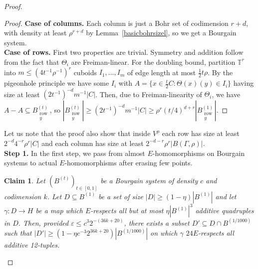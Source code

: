 \documentclass[a4paper,11pt]{article}
\numberwithin{theorem}{section}
\newtheorem{claim}[theorem]{Claim}
\theoremstyle{definition}
\newcommand{\on}[1]{
	\operatorname{#1}
}
\newcommand\ssk[1]{
	\substack{#1}
}
\begin{document}
\begin{proof}
\begin{proof}\textbf{Case of columns.} Each column is just a Bohr set of codimension $r + d$, with density at least $\rho^{r + d}$ by Lemma~\ref{basicbohrsizel}, so we get a Bourgain system.\\
\indent \textbf{Case of rows.} First two properties are trivial. Symmetry and addition follow from the fact that $\Theta_i$ are Freiman-linear. For the doubling bound, partition $\mathbb{T}^r$ into $m \leq (4t^{-1}\rho^{-1})^r$ cuboids $I_1, \dots, I_m$ of edge length at most $\frac{1}{2}t\rho$. By the pigeonhole principle we have some $I_i$ with $A = \{x \in \frac{t}{2}C : \Theta(x)(y) \in I_i\}$ having size at least $(2t^{-1})^{-d}m^{-1}|C|$. Then, due to Freiman-linearity of $\Theta_i$, we have $A - A \subseteq B_{\ssk{\on{row}\\y}}^{(t)}$, so $|B_{\ssk{\on{row}\\y}}^{(t)}| \geq (2t^{-1})^{-d}m^{-1}|C| \geq \rho^r (t/4)^{d + r} |B_{\ssk{\on{row}\\y}}^{(1)}|$.
\end{proof}

Let us note that the proof also show that inside $V^\rho$ each row has size at least $2^{-d}4^{-r}\rho^r|C|$ and each column has size at least $2^{-d-r}\rho^r|B(\Gamma, \rho)|$.\\

\noindent\textbf{Step 1.} In the first step, we pass from almost $E$-homomorphisms on Bourgain systems to actual $E$-homomorphisms after erasing few points.

\begin{claim}\label{almostfullebihomclaim1}
    Let $(B^{(t)})_{t \in [0,1]}$ be a Bourgain system of density $c$ and codimension $k$. Let $D \subseteq B^{(1)}$ be a set of size $|D| \geq (1-\eta)|B^{(1)}|$ and let $\gamma : D \to H$ be a map which $E$-respects all but at most $\eta |B^{(1)}|^3$ additive quadruples in $D$. Then, provided $\varepsilon \leq c^3 2^{-(36k + 20)}$, there exists a subset $D' \subseteq D \cap B^{(1/1000)}$ such that $|D'| \geq (1 - \eta c^{-3} 2^{36k + 20})|B^{(1/1000)}|$ on which $\gamma$ $24E$-respects all additive 12-tuples.
\end{claim}


\end{proof}
\end{document}
